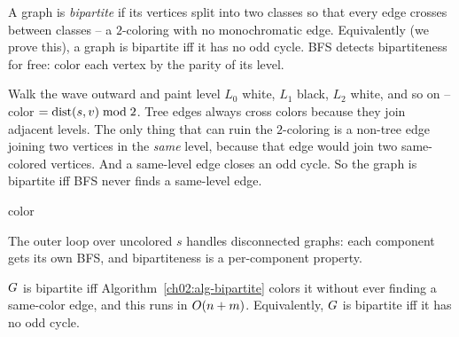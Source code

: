A graph is \emph{bipartite} if its vertices split into two classes so that every
edge crosses between classes -- a $2$-coloring with no monochromatic edge.
Equivalently (we prove this), a graph is bipartite iff it has no odd cycle. BFS
detects bipartiteness for free: color each vertex by the parity of its level.

\begin{intuitionbox}
Walk the wave outward and paint level $L_0$ white, $L_1$ black, $L_2$ white, and
so on -- color $=\operatorname{dist}(s,v) \bmod 2$. Tree edges always cross colors because they
join adjacent levels. The only thing that can ruin the $2$-coloring is a non-tree
edge joining two vertices in the \emph{same} level, because that edge would join
two same-colored vertices. And a same-level edge closes an odd cycle. So the
graph is bipartite iff BFS never finds a same-level edge.
\end{intuitionbox}

\begin{algorithm}[H]
\DontPrintSemicolon
{}
\Return $\mathrm{color}$\;
\caption{\textsc{BipartiteBfs}$(\Gph)$ -- $2$-color by level parity}
\label{ch02:alg-bipartite}
\end{algorithm}

The outer loop over uncolored $s$ handles disconnected graphs: each component
gets its own BFS, and bipartiteness is a per-component property.

\begin{theorem}
\label{ch02:thm-bipartite}
$G$ is bipartite iff Algorithm~\ref{ch02:alg-bipartite} colors it without ever
finding a same-color edge, and this runs in $O(n+m)$. Equivalently, $G$ is
bipartite iff it has no odd cycle.
\end{theorem}

